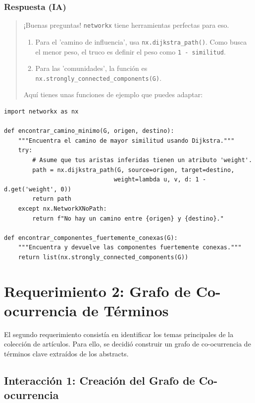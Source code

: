 \documentclass[12pt]{article}
\begin{document}
\subsubsection*{Respuesta (IA)}
\begin{quote}
¡Buenas preguntas! \texttt{networkx} tiene herramientas perfectas para eso.
\begin{enumerate}
    \item Para el 'camino de influencia', usa \texttt{nx.dijkstra\_path()}. Como busca el menor peso, el truco es definir el peso como \texttt{1 - similitud}.
    \item Para las 'comunidades', la función es \texttt{nx.strongly\_connected\_components(G)}.
\end{enumerate}
Aquí tienes unas funciones de ejemplo que puedes adaptar:
\end{quote}
\begin{lstlisting}
import networkx as nx

def encontrar_camino_minimo(G, origen, destino):
    """Encuentra el camino de mayor similitud usando Dijkstra."""
    try:
        # Asume que tus aristas inferidas tienen un atributo 'weight'.
        path = nx.dijkstra_path(G, source=origen, target=destino, 
                               weight=lambda u, v, d: 1 - d.get('weight', 0))
        return path
    except nx.NetworkXNoPath:
        return f"No hay un camino entre {origen} y {destino}."

def encontrar_componentes_fuertemente_conexas(G):
    """Encuentra y devuelve las componentes fuertemente conexas."""
    return list(nx.strongly_connected_components(G))
\end{lstlisting}

\newpage

\section{Requerimiento 2: Grafo de Co-ocurrencia de Términos}
\label{sec:req2}

El segundo requerimiento consistía en identificar los temas principales de la colección de artículos. Para ello, se decidió construir un grafo de co-ocurrencia de términos clave extraídos de los abstracts.

\subsection{Interacción 1: Creación del Grafo de Co-ocurrencia}
\end{document}
